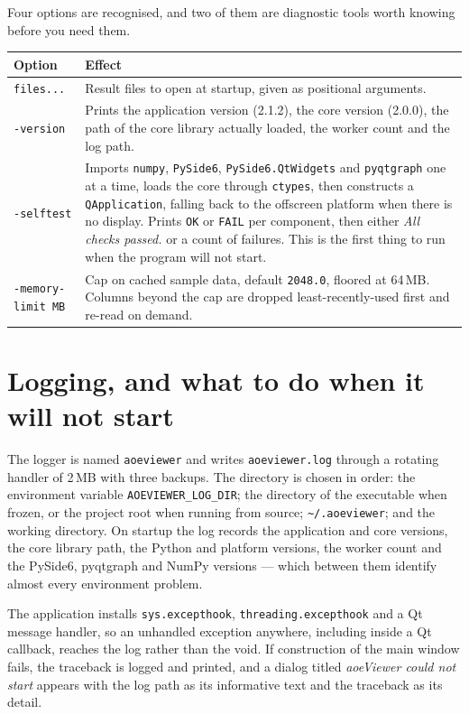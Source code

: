 \documentclass[11pt,a4paper,oneside]{report}
\newcommand{\appver}{2.1.2}
\newcommand{\code}[1]{\texttt{#1}}
\begin{document}
Four options are recognised, and two of them are diagnostic tools worth knowing
before you need them.

\begin{center}
\small
\begin{tabular}{@{}p{}p{}@{}}
\toprule
\textbf{Option} & \textbf{Effect} \\
\midrule
\code{files...} & Result files to open at startup, given as positional arguments. \\
\addlinespace
\code{-version} & Prints the application version (\appver), the core version
  (2.0.0), the path of the core library actually loaded, the worker count and
  the log path. \\
\addlinespace
\code{-selftest} & Imports \code{numpy}, \code{PySide6},
  \code{PySide6.QtWidgets} and \code{pyqtgraph} one at a time, loads the core
  through \code{ctypes}, then constructs a \code{QApplication}, falling back to
  the offscreen platform when there is no display. Prints \code{OK} or
  \code{FAIL} per component, then either \emph{All checks passed.} or a count of
  failures. This is the first thing to run when the program will not start. \\
\addlinespace
\code{-memory-limit MB} & Cap on cached sample data, default \code{2048.0},
  floored at 64\,MB. Columns beyond the cap are dropped least-recently-used
  first and re-read on demand. \\
\bottomrule
\end{tabular}
\end{center}

\section{Logging, and what to do when it will not start}

The logger is named \code{aoeviewer} and writes \code{aoeviewer.log} through a
rotating handler of 2\,MB with three backups. The directory is chosen in order:
the environment variable \code{AOEVIEWER\_LOG\_DIR}; the directory of the
executable when frozen, or the project root when running from source;
\code{\textasciitilde/.aoeviewer}; and the working directory. On startup the log
records the application and core versions, the core library path, the Python and
platform versions, the worker count and the PySide6, pyqtgraph and NumPy
versions --- which between them identify almost every environment problem.

The application installs \code{sys.excepthook},
\code{threading.excepthook} and a Qt message handler, so an unhandled exception
anywhere, including inside a Qt callback, reaches the log rather than the void.
If construction of the main window fails, the traceback is logged and printed,
and a dialog titled \emph{aoeViewer could not start} appears with the log path as
its informative text and the traceback as its detail.
\end{document}
